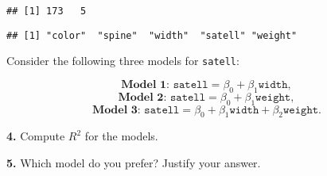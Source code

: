 \documentclass[]{article}
\begin{document}
\begin{verbatim}
## [1] 173   5
\end{verbatim}

\begin{verbatim}
## [1] "color"  "spine"  "width"  "satell" "weight"
\end{verbatim}

Consider the following three models for \texttt{satell}:

\[\textbf{Model 1: } \texttt{satell} = \beta_0 + \beta_1 \texttt{width},\]
\[\textbf{Model 2: } \texttt{satell} = \beta_0 + \beta_1 \texttt{weight},\]
\[\textbf{Model 3: } \texttt{satell} = \beta_0 + \beta_1 \texttt{width} + \beta_2 \texttt{weight}.\]

\textbf{4.} Compute \(R^2\) for the models.

\bigskip

\textbf{5.} Which model do you prefer? Justify your answer.
\end{document}
